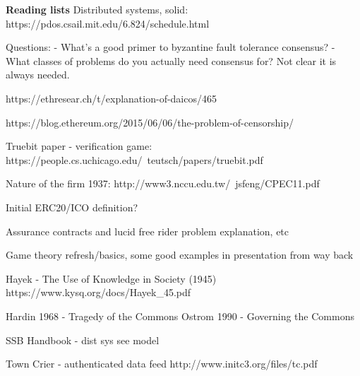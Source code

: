 \documentclass[12pt]{report}
\begin{document}
\textbf{Reading lists}
Distributed systems, solid: https://pdos.csail.mit.edu/6.824/schedule.html


Questions:
- What's a good primer to byzantine fault tolerance consensus?
- What classes of problems do you actually need consensus for? Not clear it is always needed.

https://ethresear.ch/t/explanation-of-daicos/465

https://blog.ethereum.org/2015/06/06/the-problem-of-censorship/

Truebit paper - verification game: https://people.cs.uchicago.edu/~teutsch/papers/truebit.pdf

Nature of the firm 1937: http://www3.nccu.edu.tw/~jsfeng/CPEC11.pdf

Initial ERC20/ICO definition?

Assurance contracts and lucid free rider problem explanation, etc

Game theory refresh/basics, some good examples in presentation from way back

Hayek - The Use of Knowledge in Society (1945) https://www.kysq.org/docs/Hayek_45.pdf

Hardin 1968 - Tragedy of the Commons
Ostrom 1990 - Governing the Commons

SSB Handbook - dist sys see model

Town Crier - authenticated data feed http://www.initc3.org/files/tc.pdf
\end{document}
